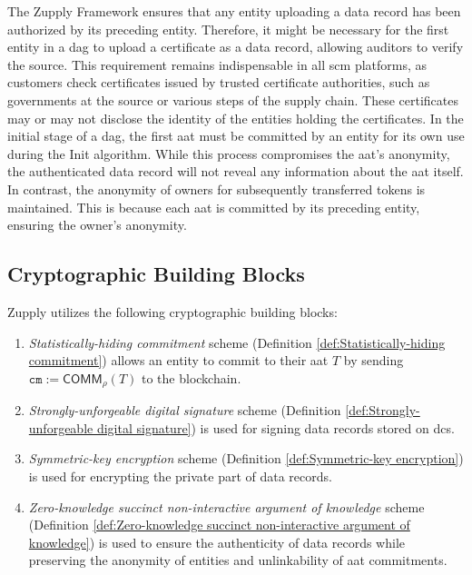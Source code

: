 The Zupply Framework ensures that any entity uploading a data record has been authorized by its preceding entity. Therefore, it might be necessary for the first entity in a \gls{dag} to upload a certificate as a data record, allowing auditors to verify the source. This requirement remains indispensable in all \gls{scm} platforms, as customers check certificates issued by trusted certificate authorities, such as governments at the source or various steps of the supply chain. These certificates may or may not disclose the identity of the entities holding the certificates. In the initial stage of a \gls{dag}, the first \gls{aat} must be committed by an entity for its own use during the \textsf{Init} algorithm. While this process compromises the \gls{aat}'s anonymity, the authenticated data record will not reveal any information about the \gls{aat} itself. In contrast, the anonymity of owners for subsequently transferred tokens is maintained. This is because each \gls{aat} is committed by its preceding entity, ensuring the owner's anonymity. 


\subsection{Cryptographic Building Blocks}

Zupply utilizes the following cryptographic building blocks: 
\begin{enumerate}
    \item \textit{Statistically-hiding commitment} scheme (Definition \ref{def:Statistically-hiding commitment}) allows an entity to commit to their \gls{aat} $T$ by sending $\texttt{cm}:=\mathsf{COMM}_\rho(T)$ to the blockchain.

    \item \textit{Strongly-unforgeable digital signature} scheme (Definition \ref{def:Strongly-unforgeable digital signature}) is used for signing data records stored on \gls{dcs}.

    \item \textit{Symmetric-key encryption} scheme (Definition \ref{def:Symmetric-key encryption})  is used for encrypting the private part of data records.

    \item \textit{Zero-knowledge succinct non-interactive argument of knowledge} scheme (Definition \ref{def:Zero-knowledge succinct non-interactive argument of knowledge}) is used to ensure the authenticity of data records while preserving the anonymity of entities and unlinkability of \gls{aat} commitments.
\end{enumerate}


